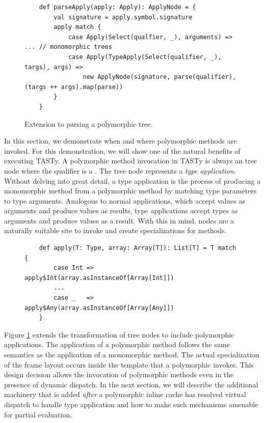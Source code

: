 \begin{figure}[!htb]
	\begin{verbatim}
	def parseApply(apply: Apply): ApplyNode = {
		val signature = apply.symbol.signature
		apply match {
			case Apply(Select(qualfier, _), arguments) => ... // monomorphic trees
			case Apply(TypeApply(Select(qualifier, _), targs), args) =>
				new ApplyNode(signature, parse(qualifier), (targs ++ args).map(parse))
		}
	}
	\end{verbatim}
	\caption{Extension to parsing a polymorphic  tree.}
	\label{impl:parse-typeapply}
\end{figure}

In this section, we demonstrate when and where polymorphic methods are invoked.
For this demonstration, we will show one of the natural benefits of executing TASTy.
A polymorphic method invocation in TASTy is always an  tree node where the qualifier is a .
The  tree node represents a \textit{type application}.
Without delving into great detail, a type application is the process of producing a monomorphic method from a polymorphic method by matching type parameters to type arguments.
Analogous to normal applications, which accept values as arguments and produce values as results, type applications accept types as arguments and produce values as a result.
With this in mind,  nodes are a naturally suitable site to invoke and create specializations for methods.

\begin{figure}[!htb]
	\begin{verbatim}
	def apply(T: Type, array: Array[T]): List[T] = T match {
		case Int => apply$Int(array.asInstanceOf[Array[Int]])
		...
		case _   => apply$Any(array.asInstanceOf[Array[Any]])
	}
	\end{verbatim}
\end{figure}

Figure \ref{impl:parse-typeapply} extends the transformation of  tree nodes to include polymorphic applications.
The application of a polymorphic method follows the same semantics as the application of a monomorphic method.
The actual specialization of the frame layout occurs inside the template that a polymorphic  invokes.
This design decision allows the invocation of polymorphic methods even in the presence of dynamic dispatch.
In the next section, we will describe the additional machinery that is added \textit{after} a polymorphic inline cache has resolved virtual dispatch to handle type application and how to make such mechanisms amenable for partial evaluation.

